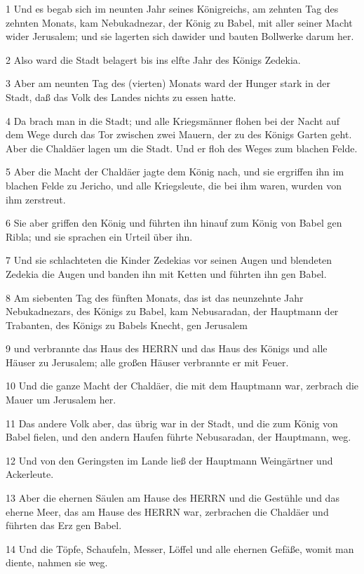 \par 1 Und es begab sich im neunten Jahr seines Königreichs, am zehnten Tag des zehnten Monats, kam Nebukadnezar, der König zu Babel, mit aller seiner Macht wider Jerusalem; und sie lagerten sich dawider und bauten Bollwerke darum her.
\par 2 Also ward die Stadt belagert bis ins elfte Jahr des Königs Zedekia.
\par 3 Aber am neunten Tag des (vierten) Monats ward der Hunger stark in der Stadt, daß das Volk des Landes nichts zu essen hatte.
\par 4 Da brach man in die Stadt; und alle Kriegsmänner flohen bei der Nacht auf dem Wege durch das Tor zwischen zwei Mauern, der zu des Königs Garten geht. Aber die Chaldäer lagen um die Stadt. Und er floh des Weges zum blachen Felde.
\par 5 Aber die Macht der Chaldäer jagte dem König nach, und sie ergriffen ihn im blachen Felde zu Jericho, und alle Kriegsleute, die bei ihm waren, wurden von ihm zerstreut.
\par 6 Sie aber griffen den König und führten ihn hinauf zum König von Babel gen Ribla; und sie sprachen ein Urteil über ihn.
\par 7 Und sie schlachteten die Kinder Zedekias vor seinen Augen und blendeten Zedekia die Augen und banden ihn mit Ketten und führten ihn gen Babel.
\par 8 Am siebenten Tag des fünften Monats, das ist das neunzehnte Jahr Nebukadnezars, des Königs zu Babel, kam Nebusaradan, der Hauptmann der Trabanten, des Königs zu Babels Knecht, gen Jerusalem
\par 9 und verbrannte das Haus des HERRN und das Haus des Königs und alle Häuser zu Jerusalem; alle großen Häuser verbrannte er mit Feuer.
\par 10 Und die ganze Macht der Chaldäer, die mit dem Hauptmann war, zerbrach die Mauer um Jerusalem her.
\par 11 Das andere Volk aber, das übrig war in der Stadt, und die zum König von Babel fielen, und den andern Haufen führte Nebusaradan, der Hauptmann, weg.
\par 12 Und von den Geringsten im Lande ließ der Hauptmann Weingärtner und Ackerleute.
\par 13 Aber die ehernen Säulen am Hause des HERRN und die Gestühle und das eherne Meer, das am Hause des HERRN war, zerbrachen die Chaldäer und führten das Erz gen Babel.
\par 14 Und die Töpfe, Schaufeln, Messer, Löffel und alle ehernen Gefäße, womit man diente, nahmen sie weg.

